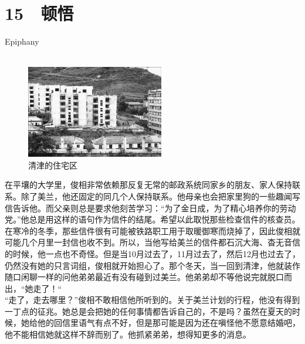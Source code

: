 \fancyhead[RO]{{\tiny{\textcolor{Gray}{\FA \ }}}\thepage}
\fancyhead[LE]{{\tiny{\textcolor{Gray}{\FA \ }}}\thepage}
\fancyfoot[LE,RO]{}
\fancyfoot[LO,CE]{}
\fancyfoot[CO,RE]{}
\chapter*{15 {\FA } 顿悟}
\vspace{5mm}
\begin{flushright}
	\textcolor{PinYinColor}{\EN \huge{Epiphany\\
	\ \\}}
\end{flushright}
\begin{figure}[!htbp]
\centering
\includegraphics[width=6cm]{./Chapters/Images/15.jpg}
\caption*{清津的住宅区}
\end{figure}

在平壤的大学里，俊相非常依赖那反复无常的邮政系统同家乡的朋友、家人保持联系。除了美兰，他还固定的同几个人保持联系。他母亲也会把家里狗的一些趣闻写信告诉他。而父亲则总是要求他刻苦学习：“为了金日成，为了精心培养你的劳动党。”他总是用这样的语句作为信件的结尾。希望以此取悦那些检查信件的核查员。在寒冷的冬季，那些信件很有可能被铁路职工用于取暖御寒而烧掉了，因此俊相就可能几个月里一封信也收不到。所以，当他写给美兰的信件都石沉大海、杳无音信的时候，他一点也不奇怪。但是当10月过去了，11月过去了，然后12月也过去了，仍然没有她的只言词组，俊相就开始担心了。那个冬天，当一回到清津，他就装作随口闲聊一样的问他弟弟最近有没有碰到过美兰。他弟弟却不等他说完就脱口而出，“她走了！“\\

“走了，走去哪里？”俊相不敢相信他所听到的。关于美兰计划的行程，他没有得到一丁点的征兆。她总是会把她的任何事情都告诉自己的，不是吗？虽然在夏天的时候，她给他的回信里语气有点不好，但是那可能是因为还在嗔怪他不愿意结婚吧，他不能相信她就这样不辞而别了。他抓紧弟弟，想得知更多的消息。\\

